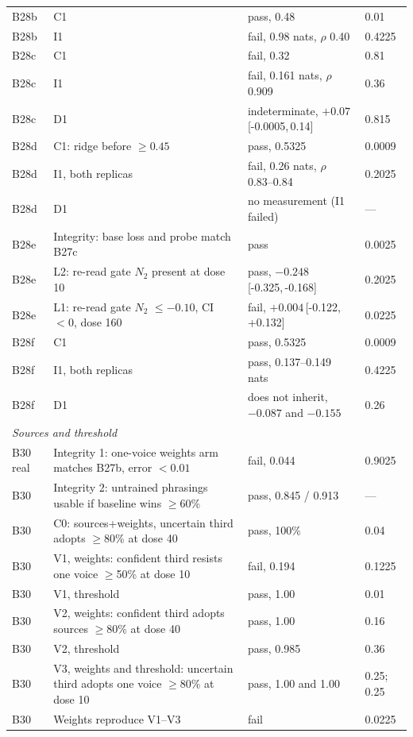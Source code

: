 \documentclass[11pt]{article}
\newcommand{\NTwo}{\ensuremath{N_2}}
\newcommand{\ci}[2]{\,[#1,\,#2]}
\begin{document}
\begin{longtable}{p{2.1cm}p{6.6cm}p{4.6cm}p{1.1cm}}
B28b & C1 & pass, 0.48 & 0.01 \\
B28b & I1 & fail, 0.98 nats, $\rho$ 0.40 & 0.4225 \\
B28c & C1 & fail, 0.32 & 0.81 \\
B28c & I1 & fail, 0.161 nats, $\rho$ 0.909 & 0.36 \\
B28c & D1 & indeterminate, $+0.07$\ci{-0.0005}{0.14} & 0.815 \\
B28d & C1: ridge before $\ge0.45$ & pass, 0.5325 & 0.0009 \\
B28d & I1, both replicas & fail, 0.26 nats, $\rho$ 0.83--0.84 & 0.2025 \\
B28d & D1 & no measurement (I1 failed) & --- \\
B28e & Integrity: base loss and probe match B27c & pass & 0.0025 \\
B28e & L2: re-read gate \NTwo{} present at dose 10 & pass, $-0.248$\ci{-0.325}{-0.168} & 0.2025 \\
B28e & L1: re-read gate \NTwo{} $\le-0.10$, CI $<0$, dose 160 & fail, $+0.004$\ci{-0.122}{+0.132} & 0.0225 \\
B28f & C1 & pass, 0.5325 & 0.0009 \\
B28f & I1, both replicas & pass, 0.137--0.149 nats & 0.4225 \\
B28f & D1 & does not inherit, $-0.087$ and $-0.155$ & 0.26 \\
\midrule
\multicolumn{4}{l}{\textit{Sources and threshold}} \\
B30 real & Integrity 1: one-voice weights arm matches B27b, error $<0.01$ & fail, 0.044 & 0.9025 \\
B30 & Integrity 2: untrained phrasings usable if baseline wins $\ge$60\% & pass, 0.845 / 0.913 & --- \\
B30 & C0: sources+weights, uncertain third adopts $\ge$80\% at dose 40 & pass, 100\% & 0.04 \\
B30 & V1, weights: confident third resists one voice $\ge$50\% at dose 10 & fail, 0.194 & 0.1225 \\
B30 & V1, threshold & pass, 1.00 & 0.01 \\
B30 & V2, weights: confident third adopts sources $\ge$80\% at dose 40 & pass, 1.00 & 0.16 \\
B30 & V2, threshold & pass, 0.985 & 0.36 \\
B30 & V3, weights and threshold: uncertain third adopts one voice $\ge$80\% at dose 10 & pass, 1.00 and 1.00 & 0.25; 0.25 \\
B30 & Weights reproduce V1--V3 & fail & 0.0225 \\

\end{longtable}
\end{document}
